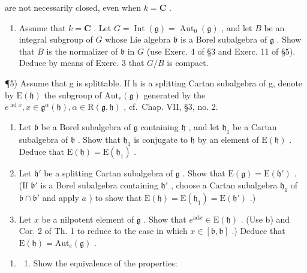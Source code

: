 are not necessarily closed, even when \(k = \mathbf{C}\) .

\begin{enumerate}
\def\labelenumi{\arabic{enumi})}
\setcounter{enumi}{3}
\tightlist
\item
  Assume that \(k = \mathbf{C}\) . Let \(G = \operatorname{Int}(\mathfrak{g}) = \operatorname{Aut}_0(\mathfrak{g})\) , and let \(B\) be an integral subgroup of \(G\) whose Lie algebra \(\mathfrak{b}\) is a Borel subalgebra of \(\mathfrak{g}\) . Show that \(B\) is the normalizer of \(\mathfrak{b}\) in \(G\) (use Exerc. 4 of §3 and Exerc. 11 of §5). Deduce by means of Exerc. 3 that \(G / B\) is compact.
\end{enumerate}

¶5) Assume that g is splittable. If h is a splitting Cartan subalgebra of g, denote by \(\mathrm{E}(\mathfrak{h})\) the subgroup of \(\mathrm{Aut}_{e}(\mathfrak{g})\) generated by the \(e^{\operatorname{ad} x}, x \in \mathfrak{g}^{\alpha}(\mathfrak{h}), \alpha \in \mathrm{R}(\mathfrak{g}, \mathfrak{h})\) , cf.~Chap. VII, §3, no. 2.

\begin{enumerate}
\def\labelenumi{\alph{enumi})}
\item
  Let \(\mathfrak{b}\) be a Borel subalgebra of \(\mathfrak{g}\) containing \(\mathfrak{h}\) , and let \(\mathfrak{h}_1\) be a Cartan subalgebra of \(\mathfrak{b}\) . Show that \(\mathfrak{h}_1\) is conjugate to \(\mathfrak{h}\) by an element of \(\mathrm{E}(\mathfrak{h})\) . Deduce that \(\mathrm{E}(\mathfrak{h}) = \mathrm{E}(\mathfrak{h}_1)\) .
\item
  Let \(\mathfrak{h}'\) be a splitting Cartan subalgebra of \(\mathfrak{g}\) . Show that \(\mathrm{E}(\mathfrak{g}) = \mathrm{E}(\mathfrak{h}')\) . (If \(\mathfrak{b}'\) is a Borel subalgebra containing \(\mathfrak{h}'\) , choose a Cartan subalgebra \(\mathfrak{h}_1\) of \(\mathfrak{b} \cap \mathfrak{b}'\) and apply \(a\) ) to show that \(\mathrm{E}(\mathfrak{h}) = \mathrm{E}(\mathfrak{h}_1) = \mathrm{E}(\mathfrak{h}')\) .)
\item
  Let \(x\) be a nilpotent element of \(\mathfrak{g}\) . Show that \(e^{\mathrm{ad}x} \in \mathrm{E}(\mathfrak{h})\) . (Use b) and Cor. 2 of Th. 1 to reduce to the case in which \(x \in [\mathfrak{b}, \mathfrak{b}]\) .) Deduce that \(\mathrm{E}(\mathfrak{h}) = \mathrm{Aut}_e(\mathfrak{g})\) .
\end{enumerate}

\begin{enumerate}
\def\labelenumi{\arabic{enumi})}
\setcounter{enumi}{5}
\tightlist
\item
  \begin{enumerate}
  \def\labelenumii{\alph{enumii})}
  \tightlist
  \item
    Show the equivalence of the properties:
  \end{enumerate}
\end{enumerate}

